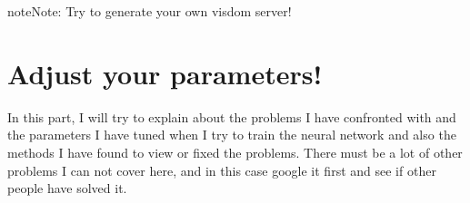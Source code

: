 \documentclass[letterpaper,10pt,english]{sphinxmanual}
\begin{document}
\begin{sphinxVerbatim}[commandchars=\\\{\}]
                

       

           

                 

                
\end{sphinxVerbatim}

\begin{sphinxadmonition}{note}{Note:}
Try to generate your own visdom server!
\end{sphinxadmonition}


\section{Adjust your parameters!}
\label{\detokenize{usage/adjust:adjust-your-parameters}}\label{\detokenize{usage/adjust::doc}}
In this part, I will try to explain about the problems I have confronted with and the parameters I have tuned when I try to train the neural network and also the methods I have found to view or fixed the problems. There must be a lot of other problems I can not cover here, and in this case google it first and see if other people have solved it.
\end{document}
